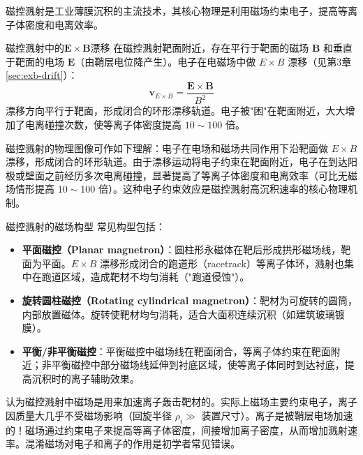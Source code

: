 \documentclass[12pt,a4paper,openany,oneside]{book}
\newcommand{\vect}[1]{\bm{#1}}
\begin{document}
磁控溅射是工业薄膜沉积的主流技术，其核心物理是利用磁场约束电子，提高等离子体密度和电离效率。

\begin{theorem}{磁控溅射中的$\vect{E}\times\vect{B}$漂移}{}{}
\label{thm:exb-magnetron}
在磁控溅射靶面附近，存在平行于靶面的磁场 $\vect{B}$ 和垂直于靶面的电场 $\vect{E}$（由鞘层电位降产生）。电子在电磁场中做 $E\times B$ 漂移（见第3章 \cref{sec:exb-drift}）：
\begin{equation}
\label{eq:exb-magnetron}
\vect{v}_{E\times B} = \frac{\vect{E}\times\vect{B}}{B^2}
\end{equation}
漂移方向平行于靶面，形成闭合的环形漂移轨道。电子被"困"在靶面附近，大大增加了电离碰撞次数，使等离子体密度提高 $10\sim 100$ 倍。
\end{theorem}

\begin{insight}{}{}
磁控溅射的物理图像可作如下理解：电子在电场和磁场共同作用下沿靶面做 $E\times B$ 漂移，形成闭合的环形轨道。由于漂移运动将电子约束在靶面附近，电子在到达阳极或壁面之前经历多次电离碰撞，显著提高了等离子体密度和电离效率（可比无磁场情形提高 $10\sim 100$ 倍）。这种电子约束效应是磁控溅射高沉积速率的核心物理机制。
\end{insight}

\begin{definition}{磁控溅射的磁场构型}{}{}
\label{def:magnetron-config}
常见构型包括：
\begin{itemize}
\item \textbf{平面磁控（Planar magnetron）}：圆柱形永磁体在靶后形成拱形磁场线，靶面为平面。$E\times B$ 漂移形成闭合的跑道形（racetrack）等离子体环，溅射也集中在跑道区域，造成靶材不均匀消耗（"跑道侵蚀"）。
\item \textbf{旋转圆柱磁控（Rotating cylindrical magnetron）}：靶材为可旋转的圆筒，内部放置磁体。旋转使靶材均匀消耗，适合大面积连续沉积（如建筑玻璃镀膜）。
\item \textbf{平衡/非平衡磁控}：平衡磁控中磁场线在靶面闭合，等离子体约束在靶面附近；非平衡磁控中部分磁场线延伸到衬底区域，使等离子体同时到达衬底，提高沉积时的离子辅助效果。
\end{itemize}
\end{definition}

\begin{warning}{}{}
认为磁控溅射中磁场是用来加速离子轰击靶材的。实际上磁场主要约束电子，离子因质量大几乎不受磁场影响（回旋半径 $\rho_i \gg$ 装置尺寸）。离子是被鞘层电场加速的！磁场通过约束电子来提高等离子体密度，间接增加离子密度，从而增加溅射速率。混淆磁场对电子和离子的作用是初学者常见错误。
\end{warning}
\end{document}

